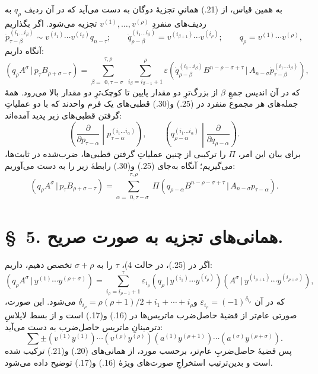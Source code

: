 \documentclass[11pt]{article}
\providecommand{\pair}[2]{(#1\,|\,#2)}
\providecommand{\eps}{\varepsilon}
\begin{document}
به همین قیاس، از (21.) همانیِ تجزیهٔ دوگان به دست می‌آید که در آن ردیف $q_\rho$ به ردیف‌های منفردِ $v^{(1)},\ldots,v^{(\rho)}$ تجزیه می‌شود. اگر بگذاریم
\begin{equation}
 \dot p_{\tau-\beta}^{(i_1\ldots i_\beta)}\sim v^{(i_1)}\cdots v^{(i_\beta)}q_{n-\tau};\qquad
 \dot q_{\rho-\beta}^{(i_1\ldots i_\beta)}=v^{(i_{\beta+1})}\cdots v^{(i_\rho)};\qquad
 q_\rho=v^{(1)}\cdots v^{(\rho)},
\tag{29}
\end{equation}
آنگاه داریم:
\begin{equation}
 \pair{q_\rho A^\sigma}{p_\tau B_{\rho+\sigma-\tau}}
 =\sum_{\beta=\substack{0,\tau-\sigma}}^{\substack{\tau,\rho}}
   \sum_{i_\beta=i_{\beta-1}+1}^{\rho}\eps
\pair{\dot q_{\rho-\beta}^{(i_1\ldots i_\beta)}B^{n-\rho-\sigma+\tau}}{A_{n-\sigma}\dot p_{\tau-\beta}^{(i_1\ldots i_\beta)}} ,
\tag{30}
\end{equation}
که در آن اندیس جمعِ $\beta$ از بزرگ‌ترِ دو مقدار پایین تا کوچک‌ترِ دو مقدار بالا می‌رود. همهٔ جمله‌های هر مجموع منفرد در (25.) و(30.) قطبی‌های یک فرم واحدند که با دو عملیاتِ گرفتن قطبی‌های زیر پدید آمده‌اند:
\[
\left(\frac{\partial}{\partial p_{\tau-\alpha}}\middle|p_{\tau-\alpha}^{(i_1\ldots i_\alpha)}\right),\qquad
\left(q_{\rho-\alpha}^{(i_1\ldots i_\alpha)}\middle|\frac{\partial}{\partial q_{\rho-\alpha}}\right).
\]
برای بیان این امر، $\Pi$ را ترکیبی از چنین عملیاتِ گرفتن قطبی‌ها، ضرب‌شده در ثابت‌ها، می‌گیریم؛ آنگاه به‌جای (25.) و(30.) رابطهٔ زیر را به دست می‌آوریم:
\begin{equation}
 \pair{q_\rho A^\sigma}{p_\tau B_{\rho+\sigma-\tau}}
 =\sum_{\alpha=\substack{0,\tau-\sigma}}^{\substack{\tau,\rho}}
 \Pi\pair{q_{\rho-\alpha}B^{n-\rho-\sigma+\tau}}{A_{n-\sigma}p_{\tau-\alpha}}.
\tag{31}
\end{equation}

\section*{\S\ 5. همانی‌های تجزیه به صورت صریح.}
اگر در (25.)، در حالت 4)، $\tau$ را به $\sigma+\rho$ تخصص دهیم، داریم:
\begin{equation}
 \pair{q_\rho A^\sigma}{y^{(1)}\cdots y^{(\rho+\sigma)}}
 =\sum_{i_\rho=i_{\rho-1}+1}^{\tau}
 \eps_{i_\rho}\pair{q_\rho}{y^{(i_1)}\cdots y^{(i_\rho)}}
 \pair{A^\sigma}{y^{(i_{\rho+1})}\cdots y^{(i_{\rho+\sigma})}},
\tag{32}
\end{equation}
که در آن $\eps_{i_\rho}=(-1)^{\delta_{i_\rho}}$ و$\delta_{i_\rho}=\rho(\rho+1)/2+i_1+\cdots+i_\rho$ می‌شود. این صورت، صورتی عام‌تر از قضیهٔ حاصل‌ضرب ماتریس‌ها در (16.) و(17.) است و از بسط لاپلاسِ دترمینانِ ماتریس حاصل‌ضرب به دست می‌آید:
\[
 \sum\pm(v^{(1)}y^{(1)})\cdots(v^{(\rho)}y^{(\rho)})(a^{(1)}y^{(\rho+1)})\cdots(a^{(\sigma)}y^{(\rho+\sigma)}).
\]
پس قضیهٔ حاصل‌ضربِ عام‌تر، برحسب مورد، از همانی‌های (20.) و(21.) ترکیب شده است و بدین‌ترتیب استخراجِ صورت‌های ویژهٔ (16.) و(17.) توضیح داده می‌شود.
\end{document}
